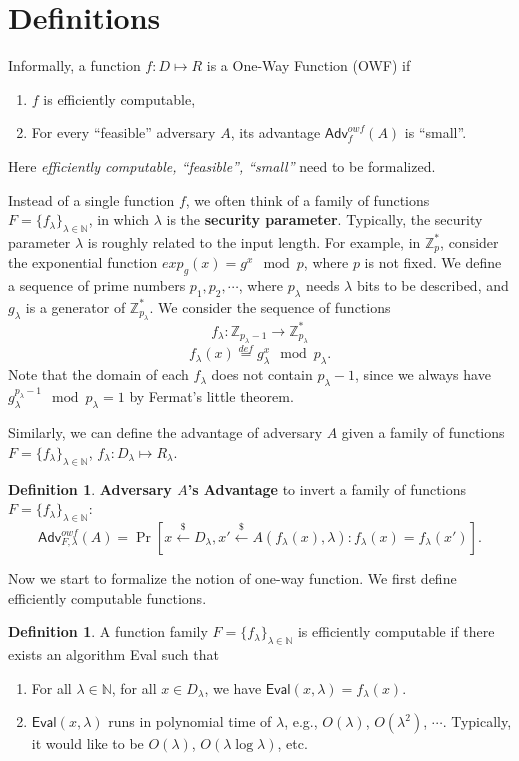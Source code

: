 \documentclass[12pt]{article}
\newcommand{\eqdef}{\stackrel{def}{=}}
\newcommand{\N}{\mathbb{N}}
\newcommand{\Z}{\mathbb{Z}}
\newcommand{\getsr}{\stackrel{\$}{\gets}}
\newcommand{\Adv}{\textsf{Adv}}
\theoremstyle{definition}
\newtheorem{definition}[theorem]{Definition}
\begin{document}
\section{Definitions}
Informally, a function $f:D\mapsto R$ is a One-Way Function (OWF) if
\begin{enumerate}
\item $f$ is efficiently computable,
\item For every ``feasible'' adversary $A$, its advantage $\Adv_f^{owf}(A)$ is ``small''.
\end{enumerate}
Here \emph{efficiently computable, ``feasible'', ``small''} need to be formalized.

Instead of a single function $f$, we often think of a family of functions $F = \{f_\lambda\}_{\lambda\in\N}$, in which $\lambda$ is the {\bf security parameter}. Typically, the security parameter $\lambda$ is roughly related to the input length. For example, in $\Z_p^*$, consider the exponential function $exp_g(x) = g^x \mod p$, where $p$ is not fixed. We define a sequence of prime numbers $p_1, p_2, \cdots$, where $p_\lambda$ needs $\lambda$ bits to be described, and $g_\lambda$ is a generator of $\Z_{p_\lambda}^*$. We consider the sequence of functions
$$f_\lambda : \Z_{p_\lambda-1} \to \Z_{p_\lambda}^*$$
$$f_\lambda (x) \eqdef g_\lambda^x \mod p_\lambda. $$
Note that the domain of each $f_\lambda$ does not contain $p_\lambda-1$, since we always have $g_\lambda^{p_\lambda-1} \mod p_\lambda = 1$ by Fermat's little theorem.

Similarly, we can define the advantage of adversary $A$ given a family of functions $F = \{f_\lambda\}_{\lambda\in\N}$, $f_\lambda : D_\lambda \mapsto R_\lambda$.
\begin{definition}
{\bf Adversary $A$'s Advantage} to invert a family of functions $F = \{f_\lambda\}_{\lambda\in\N}$:
$$\Adv_{F,\lambda}^{owf}(A) = \Pr [x\getsr D_\lambda, x'\getsr A(f_\lambda(x), \lambda) : f_\lambda(x)=f_\lambda(x')].$$
\end{definition}

Now we start to formalize the notion of one-way function. We first define efficiently computable functions.
\begin{definition}
A function family $F = \{f_\lambda\}_{\lambda\in\N}$ is efficiently computable if there exists an algorithm \textsf{Eval} such that
\begin{enumerate}
\item For all $\lambda\in\N$, for all $x\in D_\lambda$, we have $\textsf{Eval}(x, \lambda) = f_\lambda(x)$.
\item $\textsf{Eval}(x,\lambda)$ runs in polynomial time of $\lambda$, e.g., $O(\lambda)$, $O(\lambda^2)$, $\cdots$. Typically, it would like to be $O(\lambda)$, $O(\lambda \log \lambda)$, etc.
\end{enumerate}
\end{definition}
\end{document}
